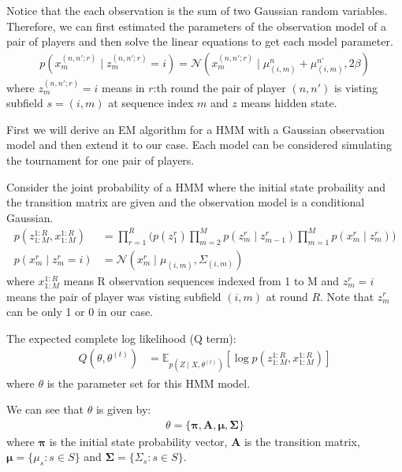 \documentclass[12pt]{article}
\newenvironment{problem}[2][Problem]{\begin{trivlist}
\item[\hskip \labelsep {\bfseries #1}\hskip \labelsep {\bfseries #2.}]}{\end{trivlist}}
\begin{document}
\pagebreak
\begin{problem}{2.6.18}
Notice that the each observation is the sum of two Gaussian random variables.
Therefore, we can first estimated the parameters of the observation model of 
a pair of players and then solve the linear equations to get each model parameter.
\begin{align*}
    p(x_m^{(n,n';r)}\mid z_m^{(n,n';r)} = i) = \mathcal{N}(x_m^{(n,n';r)} 
            \mid \mu^{n}_{(i,m)} + \mu^{n'}_{(i,m)}, 2\beta)
\end{align*}
where $z_m^{(n,n';r)} = i$ means in $r$:th round the pair of player $(n, n')$ is visting 
subfield $s = (i, m)$ at sequence index $m$ and $z$ means hidden state.

First we will derive an EM algorithm for a HMM with a Gaussian observation model 
and then extend it to our case. Each model can be considered simulating the tournament
for one pair of players.

Consider the joint probability of a HMM where the initial state probaility and 
the transition matrix are given and the observation model is a conditional
Gaussian.
\begin{align*}
    p(z^{1:R}_{1:M}, x^{1:R}_{1:M}) &= \prod_{r=1}^{R} \biggl(
            p(z^r_1) \prod_{m=2}^{M}p(z^r_m\mid z^r_{m-1})
            \prod_{m=1}^{M}p(x^r_m\mid z^r_m) \biggl)\\
    p(x^r_m\mid z^r_m= i) &= \mathcal{N}(x^r_m \mid \mu_{(i,m)}, \Sigma_{(i,m)})
\end{align*}
where $x^{1:R}_{1:M}$ means R observation sequences indexed from 1 to M and
$z^r_m= i$ means the pair of player was visting subfield $(i, m)$ at round $R$.
Note that $z^r_m$ can be only 1 or 0 in our case.

The expected complete log likelihood (Q term):
\begin{align*}
    Q(\theta, \theta^{(t)}) &= \mathbb{E}_{p(Z\mid X, \theta^{(t)})}[
        \log p(z^{1:R}_{1:M}, x^{1:R}_{1:M})]
\end{align*}
where $\theta$ is the parameter set for this HMM model.

We can see that $\theta$ is given by:
\begin{align*}
    \theta = \{\bm{\pi}, \bm{A}, \bm{\mu}, \bm{\Sigma}\}
\end{align*}
where $\bm{\pi}$ is the initial state probability vector, $\bm{A}$ is the transition
matrix, $\bm{\mu} = \{ \mu_s: s \in S\}$ and $\bm{\Sigma} = \{ \Sigma_s: s \in S\}$.


\end{problem}
\end{document}
